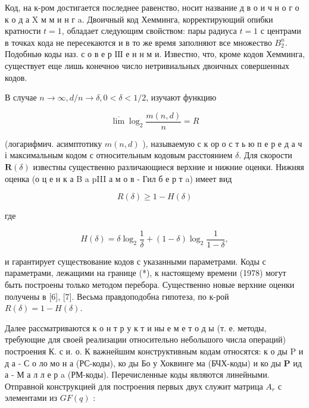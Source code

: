 \documentclass[10pt]{article}
\begin{document}
Код, на к-ром достигается последнее равенство, носит название д в о и ч н о г о к о д а X м м и н г a. Двоичный код Хемминга, корректирующий опибки кратности $t=1$, обладает следующим свойством: пары радиуса $t=1$ с центрами в точках кода не пересекаются и в то же время заполняют все множество $B_{2}^{n}$. Подобныө коды наз. с о в е р ІІІ е н н м и. Известно, что, кроме кодов Хемминга, существует еще лишь конечноө число нетривиальных двоичных совершенных кодов.



В случае $n \rightarrow \infty, d / n \rightarrow \delta, 0<\delta<1 / 2$, изучают функцию



\[

\overline{\lim } \log _{2} \frac{m(n, d)}{n}=R

\]



(логарифмич. асимптотику $m(n, d)$ ), называемую с к ор о с т ь ю п е р е д а ч і максимальным кодом с относительным кодовым расстоянием $\delta$. Для скорости $\boldsymbol{R}(\delta)$ известны существенно различающиеся верхние и нижние оценки. Нижняя оценка (о ц е н к а B a pIII а м о в - Гил б е р т a) имеет вид



\[

R(\delta) \geqslant 1-H(\delta)

\]



где



\[

H(\delta)=\delta \log _{2} \frac{1}{\delta}+(1-\delta) \log _{2} \frac{1}{1-\delta},

\]



и гарантирует существование кодов с указанными параметрами. Коды с параметрами, лежащими на границе (*), к настоящему времени (1978) могут быть построены только методом перебора. Существенно новые верхние оценки получены в [6], [7]. Весьма правдоподобна гипотеза, по к-рой $R(\delta)=1-H(\delta)$.



Далее рассматриваются к о н т р у к т и ны е м е т о д ы (т. е. методы, требующие для своей реализации относительно небольшого числа операций) построения К. с и. о. К важнейшим конструктивным кодам относятся: к о ды $\mathrm{P}$ и д а - С о ло мо н а (РС-коды), ко ды Бо у Хоквинге ма (БЧХ-коды) и ко ды $\mathbf{P}$ ид а - М а л л е р a (РМ-коды). Перечисленные коды являются линейными. Отправной конструкцией для построения первых двух служит матрица $A_{r}$ с элементами из $G F(q)$ :
\end{document}
